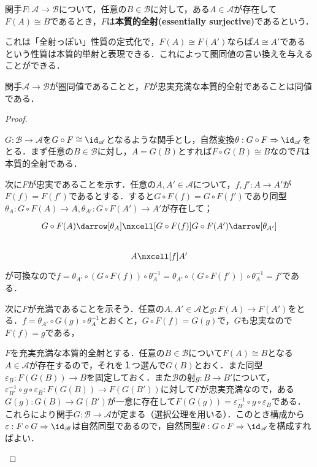 \begin{defi}[本質的全射]
	関手$F:\mathscr{A}\to\mathscr{B}$について，任意の$B\in\mathscr{B}$に対して，ある$A\in\mathscr{A}$が存在して$F(A)\cong B$であるとき，$F$は\textbf{本質的全射(essentially surjective)}であるという．
\end{defi}

これは「全射っぽい」性質の定式化で，$F(A)\cong F(A')$ならば$A\cong A'$であるという性質は本質的単射と表現できる．これによって圏同値の言い換えを与えることができる．

\begin{thm}
	関手$\mathscr{A}\to\mathscr{B}$が圏同値であることと，$F$が忠実充満な本質的全射であることは同値である．
\end{thm}

\begin{proof}
	\begin{eqv}
		\item $G:\mathscr{B}\to\mathscr{A}$を$G\circ F\cong\id_{\mathscr{A}}$となるような関手とし，自然変換$\theta:G\circ F\Rightarrow\id_{\mathscr{A}}$をとる．まず任意の$B\in\mathscr{B}$に対し，$A=G(B)$とすれば$F\circ G(B)\cong B$なので$F$は本質的全射である．
		
		次に$F$が忠実であることを示す．任意の$A,A'\in\mathscr{A}$について，$f,f':A\to A'$が$F(f)=F(f')$であるとする．すると$G\circ F(f)=G\circ F(f')$であり同型$\theta_A:G\circ F(A)\to A,\theta_{A'}:G\circ F(A')\to A'$が存在して；
		\[\begin{tikzcd}
			G\circ F(A)\darrow[\theta_A]\nxcell[G\circ F(f)]G\circ F(A')\darrow[\theta_{A'}]\\
			A\nxcell[f]A'
		\end{tikzcd}\]
		が可換なので$f=\theta_{A'}\circ(G\circ F(f))\circ\theta_A^{-1}=\theta_{A'}\circ(G\circ F(f'))\circ\theta_A^{-1}=f'$である．
		
		次に$F$が充満であることを示そう．任意の$A,A'\in\mathscr{A}$と$g:F(A)\to F(A')$をとる．$f=\theta_{A'}\circ G(g)\circ\theta_{A}^{-1}$とおくと，$G\circ F(f)=G(g)$で，$G$も忠実なので$F(f)=g$である，
		
		\item $F$を充実充満な本質的全射とする．任意の$B\in\mathscr{B}$について$F(A)\cong B$となる$A\in\mathscr{A}$が存在するので，それを１つ選んで$G(B)$とおく．また同型$\varepsilon_B:F(G(B))\to B$を固定しておく．また$\mathscr{B}$の射$g:B\to B'$について，$\varepsilon_{B'}^{-1}\circ g\circ\varepsilon_B:F(G(B))\to F(G(B'))$に対して$F$が忠実充満なので，ある$G(g):G(B)\to G(B')$が一意に存在して$F(G(g))=\varepsilon_{B'}^{-1}\circ g\circ\varepsilon_B$である．これらにより関手$G:\mathscr{B}\to\mathscr{A}$が定まる（選択公理を用いる）．このとき構成から$\varepsilon:F\circ G\Rightarrow \id_{\mathscr{B}}$は自然同型であるので，自然同型$\theta:G\circ F\Rightarrow\id_{\mathscr{A}}$を構成すればよい．
		

\end{eqv}
\end{proof}
